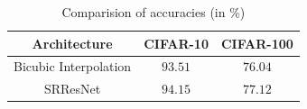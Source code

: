 \documentclass[10pt,twocolumn,letterpaper]{article}
\begin{document}
\begin{table} 
    \begin{center}
    \begin{tabular}{|| c | c | c ||}
        \hline
        Architecture & CIFAR-10 & CIFAR-100 \\
        \hline\hline
        Bicubic Interpolation & $93.51$  & $76.04$ \\
        \hline
        SRResNet &  $\mathbf{94.15} $ & $\mathbf{77.12}$ \\
        \hline
    \end{tabular}
    
    \caption{Comparision of accuracies (in \%) }
    \label{tab:my_label}
    \end{center}
\end{table}

{\small


}
\end{document}
